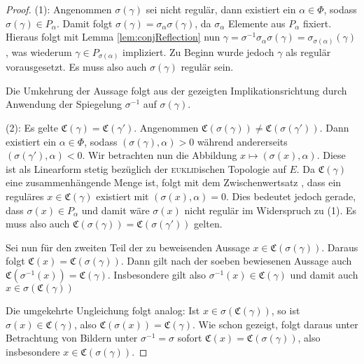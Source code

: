 \begin{proof}
  (1): 
  Angenommen $\sigma(\gamma)$ sei nicht regulär, dann existiert ein $\alpha \in \Phi$, sodass $\sigma(\gamma) \in P_\alpha$.
  Damit folgt $\sigma(\gamma) = \sigma_\alpha \sigma(\gamma)$, da $\sigma_\alpha$ Elemente aus $P_\alpha$ fixiert.
  Hieraus folgt mit Lemma \ref{lem:conjReflection} nun $\gamma = \sigma^{-1} \sigma_\alpha \sigma(\gamma) = \sigma_{\sigma(\alpha)}(\gamma)$, was wiederum $\gamma \in P_{\sigma(\alpha)}$ impliziert.
  Zu Beginn wurde jedoch $\gamma$ als regulär vorausgesetzt.
  Es muss also auch $\sigma(\gamma)$ regulär sein.
  
  Die Umkehrung der Aussage folgt aus der gezeigten Implikationsrichtung durch Anwendung der Spiegelung $\sigma^{-1}$ auf $\sigma(\gamma)$.

  (2): 
  Es gelte $\mathfrak{C}(\gamma) = \mathfrak{C}(\gamma')$.
  Angenommen $\mathfrak{C}(\sigma(\gamma)) \neq \mathfrak{C}(\sigma(\gamma'))$.
  Dann existiert ein $\alpha \in \Phi$, sodass $(\sigma(\gamma), \alpha) > 0$ während andererseits $(\sigma(\gamma'), \alpha) < 0$.
  Wir betrachten nun die Abbildung $x \mapsto  (\sigma(x), \alpha)$.
  Diese ist als Linearform stetig bezüglich der \textsc{euklid}ischen Topologie auf $E$.
  Da $\mathfrak{C}(\gamma)$ eine zusammenhängende Menge ist, folgt mit dem Zwischenwertsatz \cite[S.232]{bartsch2015allgemeine}, dass ein reguläres $x \in \mathfrak{C}(\gamma)$ existiert mit $(\sigma(x), \alpha) = 0$.
  Dies bedeutet jedoch gerade, dass $\sigma(x) \in P_\alpha$ und damit wäre $\sigma(x)$ nicht regulär im Widerspruch zu (1). Es muss also auch $\mathfrak{C}(\sigma(\gamma)) = \mathfrak{C}(\sigma(\gamma'))$ gelten.
  
  Sei nun für den zweiten Teil der zu beweisenden Aussage $x \in \mathfrak{C}(\sigma(\gamma))$.
  Daraus folgt $\mathfrak{C}(x) = \mathfrak{C}(\sigma(\gamma))$.
  Dann gilt nach der soeben bewiesenen Aussage auch $\mathfrak{C}(\sigma^{-1}(x)) = \mathfrak{C}(\gamma)$.
  Insbesondere gilt also $\sigma^{-1}(x) \in \mathfrak{C}(\gamma)$ und damit auch $x \in \sigma(\mathfrak{C}(\gamma))$
  
  Die umgekehrte Ungleichung folgt analog: Ist $x \in \sigma(\mathfrak{C}(\gamma))$, so ist $\sigma(x) \in \mathfrak{C}(\gamma)$, also $\mathfrak{C}(\sigma(x)) = \mathfrak{C}(\gamma)$. 
  Wie schon gezeigt, folgt daraus unter Betrachtung von Bildern unter $\sigma^{-1} = \sigma$ sofort $\mathfrak{C}(x) = \mathfrak{C}(\sigma(\gamma))$, also insbesondere $x \in \mathfrak{C}(\sigma(\gamma))$.


\end{proof}
